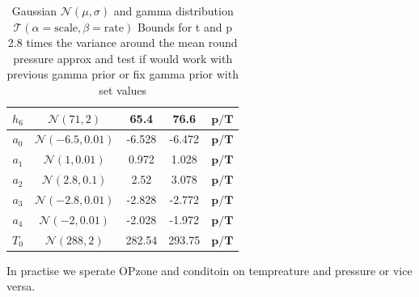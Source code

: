 \begin{table}
\begin{tabular}{ |c||c|c|c|c|   }
		$h_{6}$ &  $\mathcal{N}(71,2)$&65.4 &76.6&$\bm{p/T}$\\ \hline
		$a_{0}$ &  $\mathcal{N}(-6.5,0.01)$&-6.528 &-6.472&$\bm{p/T}$\\ \hline
		$a_{1}$ &  $\mathcal{N}(1,0.01)$&0.972 &1.028&$\bm{p/T}$\\ \hline
		$a_{2}$ &  $\mathcal{N}(2.8,0.1)$&2.52 &3.078&$\bm{p/T}$\\ \hline
		$a_{3}$ &  $\mathcal{N}(-2.8,0.01)$&-2.828 &-2.772&$\bm{p/T}$\\ \hline
		$a_{4}$ & $\mathcal{N}(-2,0.01)$ &-2.028 &-1.972&$\bm{p/T}$\\ \hline
		$T_{0}$ &  $\mathcal{N}(288,2)$& 282.54 &293.75&$\bm{p/T}$\\
		\hline
	\end{tabular}
	\caption{Gaussian $\mathcal{N}(\mu,\sigma)$ and gamma distribution $\mathcal{T}(\alpha = \text{scale}, \beta = \text{rate})$
		Bounds for t and p 2.8 times the variance around the mean
		round pressure approx and  test if would work with previous gamma prior or fix gamma prior with set values}
	\label{tab:1}
\end{table}

In practise we sperate OPzone and conditoin on tempreature and pressure  or vice versa. 
